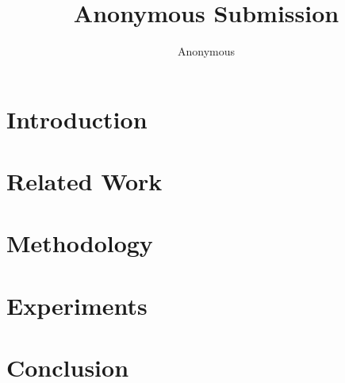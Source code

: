 \documentclass{article} %
\title{Anonymous Submission}
\author{Anonymous}
\begin{document}
\maketitle

\begin{abstract}
\end{abstract}

\section{Introduction}
\label{sec:intro}

\section{Related Work}
\label{sec:related_work}

\section{Methodology}
\label{sec:method}

\section{Experiments}
\label{sec:experiments}

\section{Conclusion}
\label{sec:conclusion}




\end{document}
